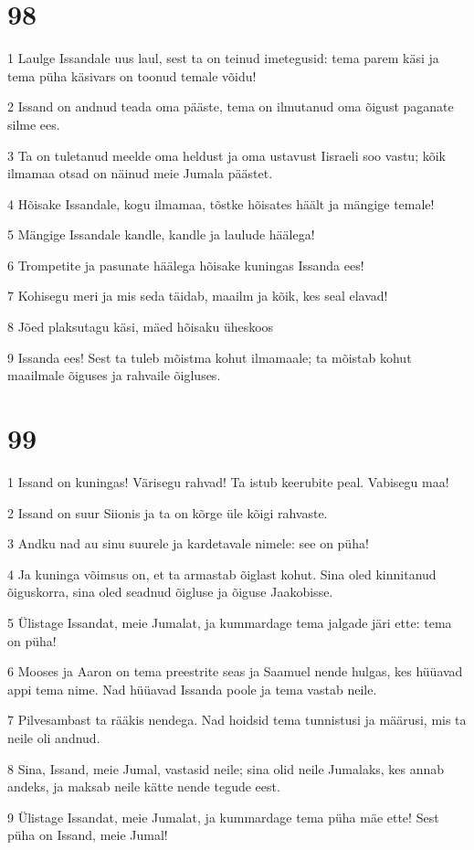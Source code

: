 \chapter{98}

\par 1 Laulge Issandale uus laul, sest ta on teinud imetegusid: tema parem käsi ja tema püha käsivars on toonud temale võidu!
\par 2 Issand on andnud teada oma pääste, tema on ilmutanud oma õigust paganate silme ees.
\par 3 Ta on tuletanud meelde oma heldust ja oma ustavust Iisraeli soo vastu; kõik ilmamaa otsad on näinud meie Jumala päästet.
\par 4 Hõisake Issandale, kogu ilmamaa, tõstke hõisates häält ja mängige temale!
\par 5 Mängige Issandale kandle, kandle ja laulude häälega!
\par 6 Trompetite ja pasunate häälega hõisake kuningas Issanda ees!
\par 7 Kohisegu meri ja mis seda täidab, maailm ja kõik, kes seal elavad!
\par 8 Jõed plaksutagu käsi, mäed hõisaku üheskoos
\par 9 Issanda ees! Sest ta tuleb mõistma kohut ilmamaale; ta mõistab kohut maailmale õiguses ja rahvaile õigluses.

\chapter{99}

\par 1 Issand on kuningas! Värisegu rahvad! Ta istub keerubite peal. Vabisegu maa!
\par 2 Issand on suur Siionis ja ta on kõrge üle kõigi rahvaste.
\par 3 Andku nad au sinu suurele ja kardetavale nimele: see on püha!
\par 4 Ja kuninga võimsus on, et ta armastab õiglast kohut. Sina oled kinnitanud õiguskorra, sina oled seadnud õigluse ja õiguse Jaakobisse.
\par 5 Ülistage Issandat, meie Jumalat, ja kummardage tema jalgade järi ette: tema on püha!
\par 6 Mooses ja Aaron on tema preestrite seas ja Saamuel nende hulgas, kes hüüavad appi tema nime. Nad hüüavad Issanda poole ja tema vastab neile.
\par 7 Pilvesambast ta rääkis nendega. Nad hoidsid tema tunnistusi ja määrusi, mis ta neile oli andnud.
\par 8 Sina, Issand, meie Jumal, vastasid neile; sina olid neile Jumalaks, kes annab andeks, ja maksab neile kätte nende tegude eest.
\par 9 Ülistage Issandat, meie Jumalat, ja kummardage tema püha mäe ette! Sest püha on Issand, meie Jumal!

